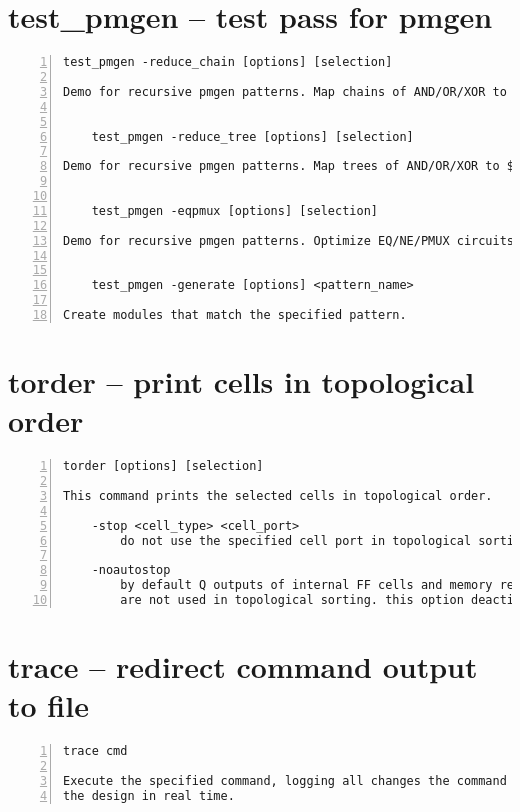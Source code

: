 \section{test\_pmgen -- test pass for pmgen}
\label{cmd:test_pmgen}
\begin{lstlisting}[numbers=left,frame=single]
    test_pmgen -reduce_chain [options] [selection]

Demo for recursive pmgen patterns. Map chains of AND/OR/XOR to $reduce_*.


    test_pmgen -reduce_tree [options] [selection]

Demo for recursive pmgen patterns. Map trees of AND/OR/XOR to $reduce_*.


    test_pmgen -eqpmux [options] [selection]

Demo for recursive pmgen patterns. Optimize EQ/NE/PMUX circuits.


    test_pmgen -generate [options] <pattern_name>

Create modules that match the specified pattern.
\end{lstlisting}

\section{torder -- print cells in topological order}
\label{cmd:torder}
\begin{lstlisting}[numbers=left,frame=single]
    torder [options] [selection]

This command prints the selected cells in topological order.

    -stop <cell_type> <cell_port>
        do not use the specified cell port in topological sorting

    -noautostop
        by default Q outputs of internal FF cells and memory read port outputs
        are not used in topological sorting. this option deactivates that.
\end{lstlisting}

\section{trace -- redirect command output to file}
\label{cmd:trace}
\begin{lstlisting}[numbers=left,frame=single]
    trace cmd

Execute the specified command, logging all changes the command performs on
the design in real time.
\end{lstlisting}

